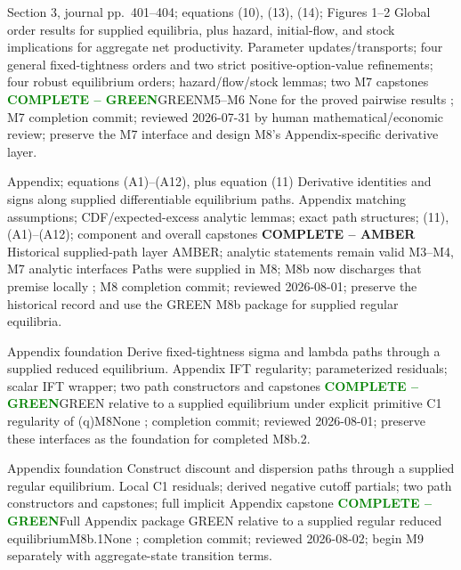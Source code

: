 \documentclass[10pt]{article}
\newcommand{\code}[1]{\texttt{\detokenize{#1}}}
\newcommand{\statusGreen}[1]{\textcolor{green}{\textbf{#1}}}
\newcommand{\statusReview}[1]{\textcolor{amber}{\textbf{#1}}}
\begin{document}
{Section 3, journal pp.~401--404; equations (10), (13), (14); Figures 1--2}
{Global order results for supplied equilibria, plus hazard, initial-flow, and stock implications for aggregate net productivity.}
{Parameter updates/transports; four general fixed-tightness orders and two
strict positive-option-value refinements; four robust equilibrium orders;
hazard/flow/stock lemmas; two M7 capstones}
{\statusGreen{COMPLETE -- GREEN}}{GREEN}{M5--M6}
{None for the proved pairwise results}
{\code{issue2}; M7 completion commit; reviewed 2026-07-31 by human
mathematical/economic review; preserve the M7 interface and design M8's
Appendix-specific derivative layer.}

{Appendix; equations (A1)--(A12), plus equation (11)}
{Derivative identities and signs along supplied differentiable equilibrium paths.}
{Appendix matching assumptions; CDF/expected-excess analytic lemmas; exact
path structures; (11), (A1)--(A12); component and overall capstones}
{\statusReview{COMPLETE -- AMBER}}
{Historical supplied-path layer AMBER; analytic statements remain valid}
{M3--M4, M7 analytic interfaces}
{Paths were supplied in M8; M8b now discharges that premise locally}
{\code{issue2}; M8 completion commit; reviewed 2026-08-01; preserve the
historical record and use the GREEN M8b package for supplied regular equilibria.}

{Appendix foundation}
{Derive fixed-tightness sigma and lambda paths through a supplied reduced equilibrium.}
{Appendix IFT regularity; parameterized residuals; scalar IFT wrapper; two
path constructors and capstones}
{\statusGreen{COMPLETE -- GREEN}}{GREEN relative to a supplied equilibrium
under explicit primitive C1 regularity of (q)}{M8}{None}
{\code{issue2}; completion commit; reviewed 2026-08-01; preserve these
interfaces as the foundation for completed M8b.2.}

{Appendix foundation}
{Construct discount and dispersion paths through a supplied regular equilibrium.}
{Local C1 residuals; derived negative cutoff partials; two path constructors
and capstones; full implicit Appendix capstone}
{\statusGreen{COMPLETE -- GREEN}}{Full Appendix package GREEN relative to a
supplied regular reduced equilibrium}{M8b.1}{None}
{\code{issue2}; completion commit; reviewed 2026-08-02; begin M9 separately
with aggregate-state transition terms.}
\end{document}
